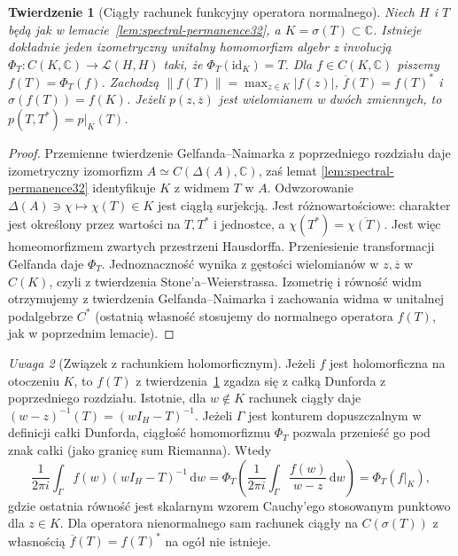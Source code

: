 \documentclass[11pt,a4paper]{article}
\numberwithin{equation}{section}
\theoremstyle{plain}
\newtheorem{twierdzenie}{Twierdzenie}[section]
\theoremstyle{definition}
\theoremstyle{remark}
\newtheorem{uwaga}[twierdzenie]{Uwaga}
\newcommand{\C}{\mathbb C}
\begin{document}
\begin{twierdzenie}[Ciągły rachunek funkcyjny operatora normalnego]
\label{thm:continuous-calculus32}
Niech $H$ i $T$ będą jak w lemacie~\ref{lem:spectral-permanence32},
a $K=\sigma(T)\subset\C$. Istnieje dokładnie jeden izometryczny
unitalny homomorfizm algebr z involucją
$\Phi_T:C(K,\C)\to\mathcal L(H,H)$ taki, że
$\Phi_T(\mathrm{id}_K)=T$. Dla $f\in C(K,\C)$ piszemy $f(T)=\Phi_T(f)$.
Zachodzą
$\|f(T)\|=\max_{z\in K}|f(z)|$,
$\overline f(T)=f(T)^*$ i $\sigma(f(T))=f(K)$.
Jeżeli $p(z,\overline z)$ jest wielomianem w dwóch zmiennych,
to $p(T, T^*)=p|_K(T)$.
\end{twierdzenie}
\begin{proof}
Przemienne twierdzenie Gelfanda--Naimarka z
poprzedniego rozdziału daje izometryczny
izomorfizm $A\simeq C(\Delta(A),\C)$, zaś lemat
\ref{lem:spectral-permanence32} identyfikuje $K$ z widmem $T$
w $A$. Odwzorowanie
$\Delta(A)\ni\chi\mapsto\chi(T)\in K$ jest ciągłą surjekcją.
Jest różnowartościowe: charakter jest określony przez wartości
na $T,T^*$ i jednostce, a $\chi(T^*)=\overline{\chi(T)}$.
Jest więc homeomorfizmem zwartych przestrzeni Hausdorffa.
Przeniesienie transformacji Gelfanda daje $\Phi_T$.
Jednoznaczność wynika z gęstości wielomianów w $z,\overline z$
w $C(K)$, czyli z twierdzenia Stone'a--Weierstrassa.
Izometrię i równość widm otrzymujemy z twierdzenia
Gelfanda--Naimarka i zachowania widma w unitalnej
podalgebrze $C^*$ (ostatnią własność stosujemy do normalnego
operatora $f(T)$, jak w poprzednim lemacie).
\end{proof}

\begin{uwaga}[Związek z rachunkiem holomorficznym]
Jeżeli $f$ jest holomorficzna na otoczeniu $K$, to $f(T)$
z twierdzenia~\ref{thm:continuous-calculus32} zgadza się z całką
Dunforda z poprzedniego rozdziału.
Istotnie, dla $w\notin K$ rachunek ciągły daje
$(w-z)^{-1}(T)=(wI_H-T)^{-1}$. Jeżeli $\Gamma$ jest
konturem dopuszczalnym w definicji całki Dunforda,
ciągłość homomorfizmu $\Phi_T$ pozwala przenieść go
pod znak całki (jako granicę sum Riemanna). Wtedy
\[
 \frac1{2\pi i}\int_\Gamma f(w)(wI_H-T)^{-1}\,\mathrm dw
 =\Phi_T\!\left(\frac1{2\pi i}\int_\Gamma
 \frac{f(w)}{w-z}\,\mathrm dw\right)=\Phi_T(f|_K),
\]
gdzie ostatnia równość jest skalarnym wzorem Cauchy'ego
stosowanym punktowo dla $z\in K$.
Dla operatora nienormalnego sam rachunek
ciągły na $C(\sigma(T))$ z własnością $\overline f(T)=f(T)^*$
na ogół nie istnieje.
\end{uwaga}
\end{document}
